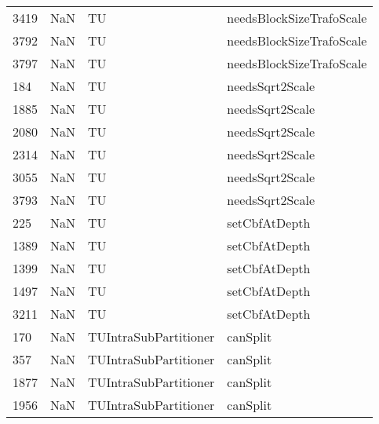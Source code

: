 \begin{tabular}{llll}
3419 &                   NaN &                         TU &                  needsBlockSizeTrafoScale \\
3792 &                   NaN &                         TU &                  needsBlockSizeTrafoScale \\
3797 &                   NaN &                         TU &                  needsBlockSizeTrafoScale \\
184  &                   NaN &                         TU &                           needsSqrt2Scale \\
1885 &                   NaN &                         TU &                           needsSqrt2Scale \\
2080 &                   NaN &                         TU &                           needsSqrt2Scale \\
2314 &                   NaN &                         TU &                           needsSqrt2Scale \\
3055 &                   NaN &                         TU &                           needsSqrt2Scale \\
3793 &                   NaN &                         TU &                           needsSqrt2Scale \\
225  &                   NaN &                         TU &                             setCbfAtDepth \\
1389 &                   NaN &                         TU &                             setCbfAtDepth \\
1399 &                   NaN &                         TU &                             setCbfAtDepth \\
1497 &                   NaN &                         TU &                             setCbfAtDepth \\
3211 &                   NaN &                         TU &                             setCbfAtDepth \\
170  &                   NaN &      TUIntraSubPartitioner &                                  canSplit \\
357  &                   NaN &      TUIntraSubPartitioner &                                  canSplit \\
1877 &                   NaN &      TUIntraSubPartitioner &                                  canSplit \\
1956 &                   NaN &      TUIntraSubPartitioner &                                  canSplit \\

\end{tabular}
